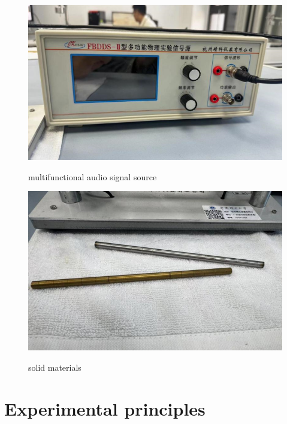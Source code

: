 \documentclass[UTF8]{article}
\begin{document}
 \begin{figure}[H]
             \begin{minipage}[t]{0.5\linewidth}
                \centering
                \includegraphics[clip,scale=0.5,trim={0 0 0 0}]{fig/fig3.png}
                \label{figure.11}
                \caption{multifunctional audio signal source}
             \end{minipage}
             \begin{minipage}[t]{0.5\linewidth}
                \centering
                \includegraphics[clip,scale=0.5,trim={0 0 0 0}]{fig/fig4.png}
                \label{figure.12}
                \caption{solid materials}
             \end{minipage}   	  
          \end{figure}       
    
        
	\section{Experimental principles}   
\end{document}

